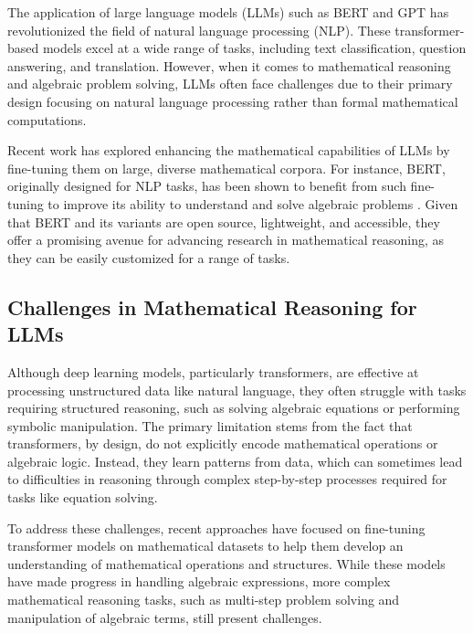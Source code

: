 \documentclass{article}
\begin{document}

The application of large language models (LLMs) such as BERT \cite{mathBERT} and GPT \cite{Brown_et_al._2020} has revolutionized the field of natural language processing (NLP). These transformer-based models excel at a wide range of tasks, including text classification, question answering, and translation. However, when it comes to mathematical reasoning and algebraic problem solving, LLMs often face challenges due to their primary design focusing on natural language processing rather than formal mathematical computations.

Recent work has explored enhancing the mathematical capabilities of LLMs by fine-tuning them on large, diverse mathematical corpora. For instance, BERT, originally designed for NLP tasks, has been shown to benefit from such fine-tuning to improve its ability to understand and solve algebraic problems \cite{mathBERT}. Given that BERT and its variants are open source, lightweight, and accessible, they offer a promising avenue for advancing research in mathematical reasoning, as they can be easily customized for a range of tasks.

\subsection{Challenges in Mathematical Reasoning for LLMs}

Although deep learning models, particularly transformers, are effective at processing unstructured data like natural language, they often struggle with tasks requiring structured reasoning, such as solving algebraic equations or performing symbolic manipulation. The primary limitation stems from the fact that transformers, by design, do not explicitly encode mathematical operations or algebraic logic. Instead, they learn patterns from data, which can sometimes lead to difficulties in reasoning through complex step-by-step processes required for tasks like equation solving.

To address these challenges, recent approaches have focused on fine-tuning transformer models on mathematical datasets to help them develop an understanding of mathematical operations and structures. While these models have made progress in handling algebraic expressions, more complex mathematical reasoning tasks, such as multi-step problem solving and manipulation of algebraic terms, still present challenges.
\end{document}
